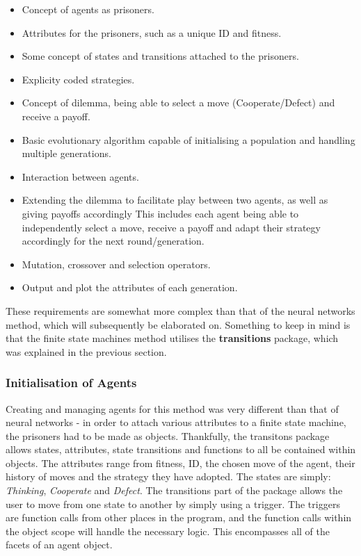 \documentclass[12pt,a4paper]{article}
\begin{document}
\begin{itemize}
  \item Concept of agents as prisoners.
  \item Attributes for the prisoners, such as a unique ID and fitness.
  \item Some concept of states and transitions attached to the prisoners.
  \item Explicity coded strategies.
  \item Concept of dilemma, being able to select a move (Cooperate/Defect) and receive a payoff.
  \item Basic evolutionary algorithm capable of initialising a population and handling multiple generations.
  \item Interaction between agents.
  \item Extending the dilemma to facilitate play between two agents, as well as giving payoffs accordingly This includes each agent being able to independently select a move, receive a payoff
	and adapt their strategy accordingly for the next round/generation.
  \item Mutation, crossover and selection operators.
  \item Output and plot the attributes of each generation. \\
\end{itemize}

These requirements are somewhat more complex than that of the neural networks method, which will subsequently be elaborated on. Something to keep in mind is that the finite state machines method utilises the \textbf{transitions} package, which was explained in the previous section.

\subsubsection{Initialisation of Agents}
Creating and managing agents for this method was very different than that of neural networks - in order to attach various attributes to a finite state machine, the prisoners had to be made as objects. Thankfully, the transitons package allows states, attributes, state transitions and functions to all be contained within objects. The attributes range from fitness, ID, the chosen move of the agent, their history of moves and the strategy they have adopted. The states are simply: \textit{Thinking}, \textit{Cooperate} and \textit{Defect}. The transitions part of the package allows the user to move from one state to another by simply using a trigger. The triggers are function calls from other places in the program, and the function calls within the object scope will handle the necessary logic. This encompasses all of the facets of an agent object.
\end{document}
